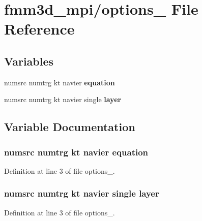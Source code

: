 \section{fmm3d\_\-mpi/options\_ File Reference}
\label{options__2}


\subsection*{Variables}
\begin{CompactItemize}
\item 
numsrc numtrg kt navier {\bf equation}
\item 
numsrc numtrg kt navier single {\bf layer}
\end{CompactItemize}


\subsection{Variable Documentation}
\subsubsection{\setlength{\rightskip}{0pt plus 5cm}numsrc numtrg kt navier {\bf equation}}\label{options__2_1fc3e5c19c13c474bf1e23cf97130dc5_1fc3e5c19c13c474bf1e23cf97130dc5}




Definition at line 3 of file options\_.
\subsubsection{\setlength{\rightskip}{0pt plus 5cm}numsrc numtrg kt navier single {\bf layer}}\label{options__2_f56b53e412e87751f665cb9f9061e50b_f56b53e412e87751f665cb9f9061e50b}




Definition at line 3 of file options\_.
